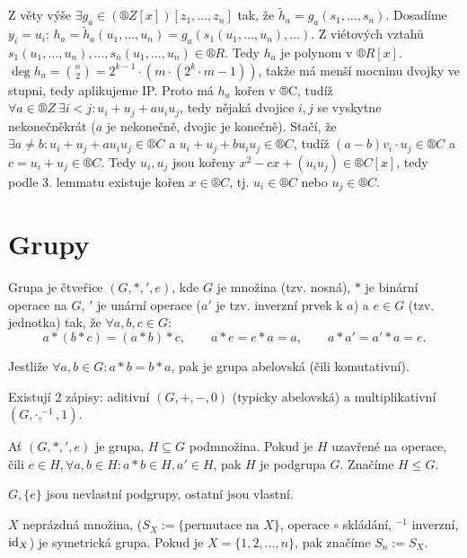 \documentclass[12pt]{article}                   %
\begin{document}
\begin{veta}
\begin{dukazin}
            Z věty výše $\exists g_a \in (®Z[x])[z_1, …, z_n]$ tak, že $\tilde h_a = g_a(s_1, …, s_n)$. Dosadíme $y_i = u_i$: $h_a = \tilde h_a(u_1, …, u_n) = g_a(s_1(u_1, …, u_n), …)$. Z viétových vztahů $s_1(u_1, …, u_n), …, s_n(u_1, …, u_n) \in ®R$. Tedy $h_a$ je polynom v $®R[x]$. $\deg h_a = \binom{n}{2} = 2^{k-1}·(m·(2^k·m - 1))$, takže má menší mocninu dvojky ve stupni, tedy aplikujeme IP. Proto má $h_a$ kořen v ®C, tudíž $\forall a \in ®Z\ \exists i < j: u_i + u_j + au_iu_j$, tedy nějaká dvojice $i, j$ se vyskytne nekonečněkrát ($a$ je nekonečně, dvojic je konečně). Stačí, že $\exists a≠b: u_i + u_j + au_iu_j \in ®C$ a $u_i + u_j + bu_iu_j \in ®C$, tudíž $(a-b)v_i·u_j \in ®C$ a $c=u_i + u_j \in ®C$. Tedy $u_i, u_j$ jsou kořeny $x^2 - cx + (u_iu_j)\in ®C[x]$, tedy podle 3. lemmatu existuje kořen $x \in ®C$, tj. $u_i \in ®C$ nebo $u_j \in ®C$.
        \end{dukazin}
    \end{veta}

\section{Grupy}
    \begin{definice}
        Grupa je čtveřice $(G, *, ', e)$, kde $G$ je množina (tzv. nosná), $*$ je binární operace na $G$, $'$ je unární operace ($a'$ je tzv. inverzní prvek k $a$) a $e \in G$ (tzv. jednotka) tak, že $\forall a, b, c \in G$:
        $$ a*(b*c) = (a*b)*c, \qquad a*e = e*a = a, \qquad a*a' = a'*a = e. $$

        Jestliže $\forall a, b \in G: a*b = b*a$, pak je grupa abelovská (čili komutativní).
    \end{definice}

    \begin{poznamka}
        Existují 2 zápisy: aditivní $(G, +, -, 0)$ (typicky abelovská) a multiplikativní $(G, ·, ^{-1}, 1)$.
    \end{poznamka}

    \begin{definice}[Podgrupa]
        Ať $(G,  *, ', e)$ je grupa, $H \subseteq G$ podmnožina. Pokud je $H$ uzavřené na operace, čili $e \in H, \forall a, b \in H: a*b \in H, a' \in H$, pak $H$ je podgrupa $G$. Značíme $H ≤ G$.

        $G, \{e\}$ jsou nevlastní podgrupy, ostatní jsou vlastní.
    \end{definice}

    \begin{priklady}
        $X$ neprázdná množina, ($S_X := \{\text{permutace na } X\}$, operace $\circ$ skládání, $^{-1}$ inverzní, $\operatorname{id}_X$) je symetrická grupa. Pokud je $X = \{1, 2, …, n\}$, pak značíme $S_n := S_X$.
    \end{priklady}
\end{document}
